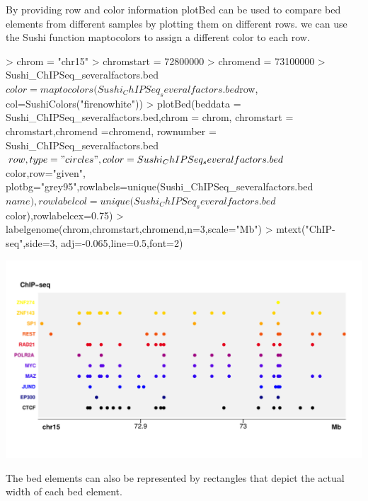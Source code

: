 \documentclass{article}
\begin{document}
By providing row and color information plotBed can be used to compare bed elements from different samples by plotting them on different rows.  we can use the Sushi function maptocolors to assign a different color to each row.

\begin{center}
\begin{Schunk}
\begin{Sinput}
> chrom            = "chr15"
> chromstart      = 72800000
> chromend         = 73100000
> Sushi_ChIPSeq_severalfactors.bed$color = 
         maptocolors(Sushi_ChIPSeq_severalfactors.bed$row,
         col=SushiColors("firenowhite"))
> plotBed(beddata    = Sushi_ChIPSeq_severalfactors.bed,chrom = chrom,
         chromstart = chromstart,chromend =chromend,
         rownumber  = Sushi_ChIPSeq_severalfactors.bed$row, type = "circles",
         color=Sushi_ChIPSeq_severalfactors.bed$color,row="given",
         plotbg="grey95",rowlabels=unique(Sushi_ChIPSeq_severalfactors.bed$name),
         rowlabelcol=unique(Sushi_ChIPSeq_severalfactors.bed$color),rowlabelcex=0.75)
> labelgenome(chrom,chromstart,chromend,n=3,scale="Mb")
> mtext("ChIP-seq",side=3, adj=-0.065,line=0.5,font=2)
\end{Sinput}
\end{Schunk}
\includegraphics{Sushi-027}
\end{center}

The bed elements can also be represented by rectangles that depict the actual width of each bed element.
\end{document}

